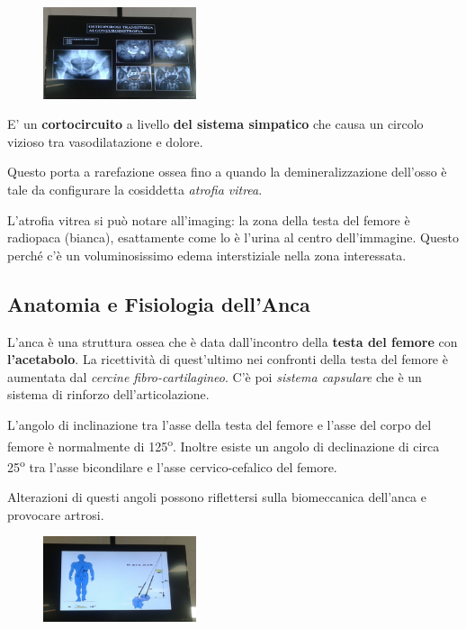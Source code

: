 \begin{figure}[!ht]
\centering
\includegraphics[width=0.4\textwidth]{019/image3.jpeg}
\end{figure}

E' un \textbf{cortocircuito} a livello \textbf{del sistema simpatico} che causa un circolo vizioso tra vasodilatazione e dolore.

Questo porta a rarefazione ossea fino a quando la demineralizzazione dell'osso è tale da configurare la cosiddetta \emph{atrofia vitrea}.

L'atrofia vitrea si può notare all'imaging: la zona della testa del femore è radiopaca (bianca), esattamente come lo è l'urina al centro dell'immagine. Questo perché c'è un voluminosissimo edema interstiziale nella zona interessata.

\subsection{Anatomia e Fisiologia dell'Anca}

L'anca è una struttura ossea che è data dall'incontro della
\textbf{testa del femore} con \textbf{l'acetabolo}. La ricettività di quest'ultimo nei confronti della testa del femore è aumentata dal \emph{cercine fibro-cartilagineo}. C'è poi \emph{sistema capsulare} che è un sistema di rinforzo dell'articolazione.

L'angolo di inclinazione tra l'asse della testa del femore e l'asse del corpo del femore è normalmente di 125\textsuperscript{o}. Inoltre esiste un angolo di declinazione di circa 25\textsuperscript{o} tra l'asse bicondilare e l'asse cervico-cefalico del femore.

Alterazioni di questi angoli possono riflettersi sulla biomeccanica dell'anca e provocare artrosi.

\begin{figure}[!ht]
\centering
\includegraphics[width=0.4\textwidth]{019/image4.jpeg}
\end{figure}

